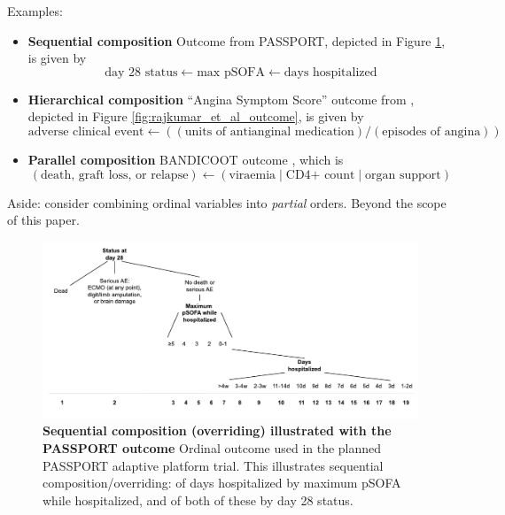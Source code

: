 \documentclass[
  11pt,
  fleqn
]{article}
\begin{document}
Examples:

\begin{itemize}
  \item \textbf{Sequential composition} Outcome from PASSPORT,
    depicted in Figure
    \ref{fig:passport_outcome}, is given by
    \[ \text{day 28 status} \leftarrow \text{max pSOFA} \leftarrow \text{days
      hospitalized}
    \]
  \item
    \textbf{Hierarchical composition} ``Angina Symptom Score'' outcome from
    \citet{rajkumarPlaceboControlledTrialPercutaneous2023}, depicted in Figure
    \ref{fig:rajkumar_et_al_outcome}, is given by \[
      \text{adverse clinical event} \leftarrow ((\text{units of
    antianginal medication}) / (\text{episodes of angina})) \]

  \item \textbf{Parallel composition} BANDICOOT outcome
    \citep{walkerCodesigningNovelOrdinal2025}, which is
    \[
      (\text{death, graft loss, or relapse}) \leftarrow (\text{viraemia} \;|\;
      \text{CD4+ count} \;|\; \text{organ support})
    \]
\end{itemize}

Aside: \citet{wittkowskiCombiningSeveralOrdinal2004} consider combining
ordinal variables into \emph{partial} orders. Beyond the scope of this paper.

\begin{figure}
  \includegraphics[width=7in]{passport_ordinal_outcome_sequential.pdf}
  \caption{\textbf{Sequential composition (overriding) illustrated
    with the PASSPORT outcome} Ordinal outcome used in the planned
    PASSPORT adaptive
    platform trial. This illustrates sequential composition/overriding:
    of days hospitalized by maximum pSOFA while hospitalized, and of
  both of these by day 28 status.}
  \label{fig:passport_outcome}
\end{figure}
\end{document}
